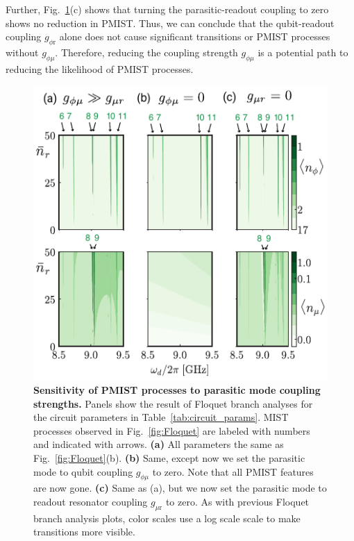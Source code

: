 \documentclass[%
reprint,
superscriptaddress,
 amsmath,amssymb,
 aps,
 prx,
longbibliography,
floatfix,
]{revtex4-2}
\begin{document}
Further, Fig.~\ref{fig:coupling-Floquet}(c) shows that turning the parasitic-readout coupling to zero shows no reduction in PMIST. Thus, we can conclude that the qubit-readout coupling $g_{\phi \textrm{r}}$ alone does not cause significant transitions or PMIST processes without $g_{\phi \mu}$. Therefore, reducing the coupling strength $g_{\phi \mu}$ is a potential path to reducing the likelihood of PMIST processes. 
\begin{figure}[t]
    \centering
    \includegraphics[width=\linewidth]{Figures/Floquet_coupling.pdf}
    \caption{
    {\bf Sensitivity of PMIST processes to parasitic mode coupling strengths.} Panels show the result of Floquet branch analyses for the circuit parameters in Table~\ref{tab:circuit_params}. MIST processes observed in Fig.~\ref{fig:Floquet} are labeled with numbers and indicated with arrows. \textbf{(a)} All parameters the same as Fig.~\ref{fig:Floquet}(b). \textbf{(b)} Same, except now we set the parasitic mode to qubit coupling $g_{\phi \mu}$ to zero.  Note that all PMIST features are now gone.  \textbf{(c)} Same as (a), but we now set the parasitic mode to readout resonator coupling $g_{\mu \textrm{r}}$ to zero.  As with previous Floquet branch analysis plots, color scales use a log scale scale to make transitions more visible.}
    \label{fig:coupling-Floquet}
\end{figure}
\end{document}

